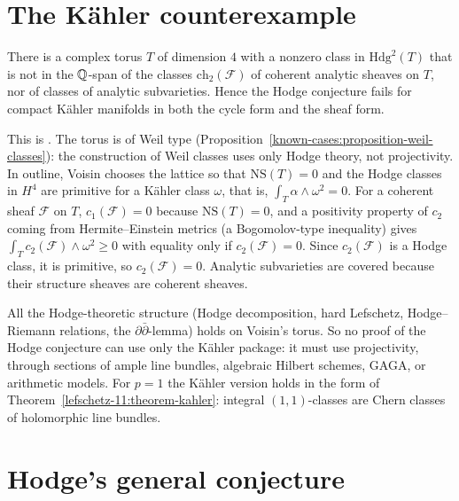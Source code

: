 \section{The K\"ahler counterexample}\label{failures:section-kahler}

\begin{theorem}[Voisin]\label{failures:theorem-voisin-kahler}
There is a complex torus $T$ of dimension $4$ with a nonzero class in $\mathrm{Hdg}^2(T)$ that is not in the $\mathbb{Q}$-span of the classes $\mathrm{ch}_2(\mathcal{F})$ of coherent analytic sheaves on $T$, nor of classes of
analytic subvarieties. Hence the Hodge conjecture fails for compact K\"ahler manifolds in both the cycle form and the sheaf form.
\end{theorem}

This is \cite{voisin-2002}. The torus is of Weil type (Proposition~\ref{known-cases:proposition-weil-classes}): the construction of Weil classes uses only Hodge theory, not projectivity. In outline,
Voisin chooses the lattice so that $\mathrm{NS}(T) = 0$ and the Hodge classes in $H^4$ are primitive for a K\"ahler class $\omega$, that is, $\int_T\alpha \wedge \omega^2 = 0$. For a coherent sheaf
$\mathcal{F}$ on $T$, $c_1(\mathcal{F}) = 0$ because $\mathrm{NS}(T) = 0$, and a positivity property of $c_2$ coming from Hermite--Einstein metrics (a Bogomolov-type inequality) gives
$\int_Tc_2(\mathcal{F}) \wedge \omega^2 \geq 0$ with equality only if $c_2(\mathcal{F}) = 0$. Since $c_2(\mathcal{F})$ is a Hodge class, it is primitive, so $c_2(\mathcal{F}) = 0$. Analytic subvarieties are
covered because their structure sheaves are coherent sheaves.

\begin{remark}\label{failures:remark-kahler-lesson}
All the Hodge-theoretic structure (Hodge decomposition, hard Lefschetz, Hodge--Riemann relations, the $\partial\bar\partial$-lemma) holds on Voisin's torus. So no proof of the Hodge conjecture can use
only the K\"ahler package: it must use projectivity, through sections of ample line bundles, algebraic Hilbert schemes, GAGA, or arithmetic models. For $p = 1$ the K\"ahler version holds in the form
of Theorem~\ref{lefschetz-11:theorem-kahler}: integral $(1,1)$-classes are Chern classes of holomorphic line bundles.
\end{remark}

\section{Hodge's general conjecture}\label{failures:section-general}

